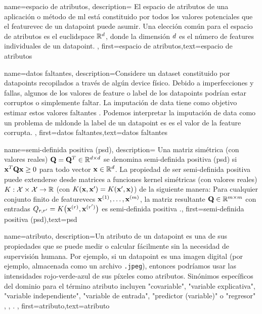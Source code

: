 {name={espacio de atributos},
	description={
		El espacio de atributos de una aplicación o método de \gls{ml}
		está constituido por todos los valores potenciales que el \gls{featurevec} de un \gls{datapoint} puede asumir.
		Una elección común para el espacio de atributos es el \gls{euclidspace} $\mathbb{R}^{d}$, 
		donde la dimensión $d$ es el número de \gls{feature}s individuales de un \gls{datapoint}.
		},
	first={espacio de atributos},text={espacio de atributos}  
}


{name={datos faltantes},
	description={Considere un \gls{dataset} constituido por \gls{datapoint}s recopilados  
		a través de algún \gls{device} físico. Debido a imperfecciones y fallas, algunos de los valores de \gls{feature} 
		o \gls{label} de los \gls{datapoint}s podrían estar corruptos o simplemente faltar.  
		La imputación de \Gls{data}  tiene como objetivo estimar estos valores faltantes \cite{Abayomi2008DiagnosticsFM}. 
		Podemos interpretar la imputación de \gls{data}  como un problema de \gls{ml}donde la \gls{label} de un \gls{datapoint} es 
		es el valor de la \gls{feature}  corrupta. 
		},
	first={datos faltantes},text={datos faltantes}  
}


{name={semi-definida positiva (psd)},
    description=
    {Una  matriz simétrica (con valores reales) $\mathbf{Q} = \mathbf{Q}^{T} \in \mathbb{R}^{d \times d}$ 
	se denomina semi-definida positiva (psd) si ${\bf x}^{T} \mathbf{Q} {\bf x} \geq 0$ para todo vector ${\bf x} \in \mathbb{R}^{d}$. 
	La propiedad de ser semi-definida positiva puede extenderse desde matrices a funciones \gls{kernel} simétricas (con valores reales) 
	$K: \mathcal{X} \times \mathcal{X} \rightarrow \mathbb{R}$ 
	(con $K({\bf x},{\bf x}') = K({\bf x}',{\bf x})$)
	de la siguiente manera: Para cualquier conjunto finito de \gls{featurevec}s ${\bf x}^{(1)},\dots,{\bf x}^{(m)}$, 
	la matriz resultante $\mathbf{Q} \in \mathbb{R}^{m \times m}$ con 
	entradas $Q_{r,r'} = K\big({\bf x}^{(r)},{\bf x}^{(r')}\big)$ 
	es semi-definida positiva \cite{LearningKernelsBook}.},
    first={semi-definida positiva (psd)},text={psd}  
}

{name={atributo},
	description={Un atributo de un \gls{datapoint} es una de sus propiedades que se puede 
		medir o calcular fácilmente sin la necesidad de supervisión humana. Por ejemplo, si un \gls{datapoint} 
		es una imagen digital (por ejemplo, almacenada como un archivo \texttt{.jpeg}), entonces podríamos usar
		las intensidades rojo-verde-azul de sus píxeles como atributos. Sinónimos específicos del dominio  
		para el término atributo incluyen "covariable", "variable explicativa", "variable independiente", "variable de entrada", "predictor (variable)" o "regresor" \cite{Gujarati2021}, \cite{Dodge2003}, \cite{Everitt2022}. 
		}, first={atributo},text={atributo}  
}

